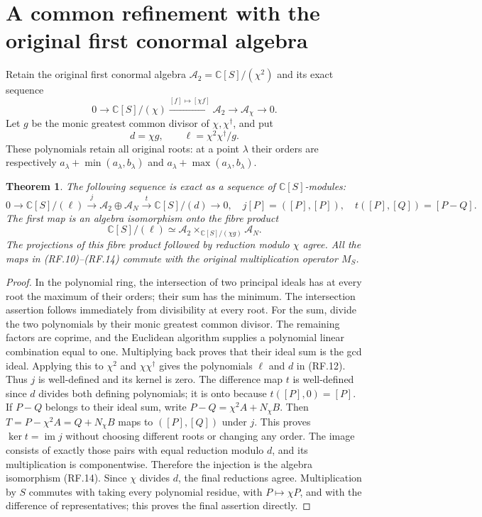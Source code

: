 \documentclass[11pt]{article}
\newtheorem{theorem}{Theorem}
\newcommand{\C}{\mathbb C}
\newcommand{\A}{\mathcal A}
\begin{document}
\section{A common refinement with the original first conormal algebra}

Retain the original first conormal algebra
$\A_2=\C[S]/(\chi^2)$ and its exact sequence
\[
 0\longrightarrow\C[S]/(\chi)
 \xrightarrow{[f]\mapsto[\chi f]}\A_2
 \longrightarrow\A_\chi\longrightarrow0.
 \tag{RF.11}
\]
Let $g$ be the monic greatest common divisor of $\chi,\chi^\dagger$,
and put
\[
 d=\chi g,\qquad
 \ell=\chi^2\chi^\dagger/g.
 \tag{RF.12}
\]
These polynomials retain all original roots: at a point $\lambda$
their orders are respectively
$a_\lambda+\min(a_\lambda,b_\lambda)$ and
$a_\lambda+\max(a_\lambda,b_\lambda)$.

\begin{theorem}
The following sequence is exact as a sequence of $\C[S]$-modules:
\[
 0\longrightarrow\C[S]/(\ell)
 \xrightarrow{\ j\ }\A_2\oplus\A_N
 \xrightarrow{\ t\ }\C[S]/(d)\longrightarrow0,
 \quad
 j[P]=([P],[P]),\quad t([P],[Q])=[P-Q].
 \tag{RF.13}
\]
The first map is an algebra isomorphism onto the fibre product
\[
 \boxed{\C[S]/(\ell)\simeq
       \A_2\mathbin{\times}_{\C[S]/(\chi g)}\A_N.}
 \tag{RF.14}
\]
The projections of this fibre product followed by reduction modulo
$\chi$ agree. All the maps in (RF.10)--(RF.14) commute with the
original multiplication operator $M_S$.
\end{theorem}

\begin{proof}
In the polynomial ring, the intersection of two principal ideals
has at every root the maximum of their orders; their sum has the
minimum. The intersection assertion follows immediately from
divisibility at every root. For the sum, divide the two polynomials
by their monic greatest common divisor. The remaining factors are
coprime, and the Euclidean algorithm supplies a polynomial linear
combination equal to one. Multiplying back proves that their ideal
sum is the gcd ideal. Applying this to $\chi^2$ and $\chi\chi^\dagger$
gives the polynomials $\ell$ and $d$ in (RF.12).
Thus $j$ is well-defined and its kernel is zero. The difference
map $t$ is well-defined since $d$ divides both defining polynomials;
it is onto because $t([P],0)=[P]$.
If $P-Q$ belongs to their ideal sum, write
$P-Q=\chi^2 A+N_\chi B$. Then
$T=P-\chi^2 A=Q+N_\chi B$ maps to $([P],[Q])$ under $j$.
This proves $\ker t=\operatorname{im}j$ without choosing different
roots or changing any order. The image consists of exactly those
pairs with equal reduction modulo $d$, and its multiplication is
componentwise. Therefore the injection is the algebra isomorphism
(RF.14). Since $\chi$ divides $d$, the final reductions agree.
Multiplication by $S$ commutes with taking every polynomial residue,
with $P\mapsto\chi P$, and with the difference of representatives;
this proves the final assertion directly.
\end{proof}
\end{document}
